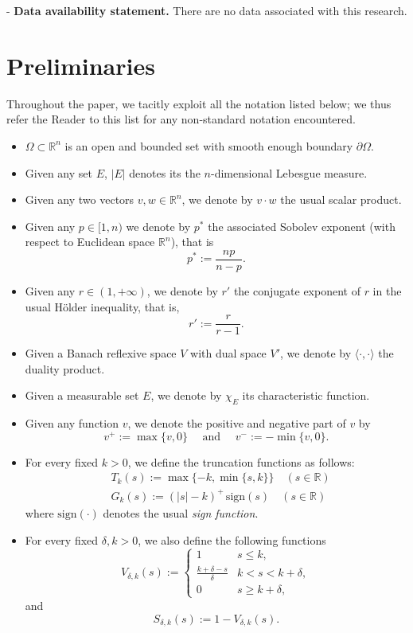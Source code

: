 \documentclass[11pt,a4paper]{amsart}
\theoremstyle{definition}
\theoremstyle{plain}
\numberwithin{equation}{section}
\begin{document}
\noindent-\,\,\textbf{Data availability statement.} There are no data associated with this research.

\section{Preliminaries}\label{sec.Prel}
 Throughout the paper, we tacitly
exploit all the notation listed below; we thus refer the Reader to this list
for any non-standard notation encountered.
\begin{itemize}
\item $\Omega \subset \mathbb{R}^{n}$ is an open and bounded set with smooth enough boundary $\partial \Omega$.
\item Given any set $E$, $|E|$ denotes its the $n$-dimensional Lebesgue measure.
\item Given any two vectors $v,w \in \mathbb{R}^{n}$, we denote by
$v\cdot w$ the usual scalar product.
\item Given any $p \in [1,n)$ we denote by $p^{*}$ the associated Sobolev exponent (with respect to Euclidean space $\mathbb{R}^n$), that is
$$p^{*}  := \frac{np}{n-p}.$$
\item Given any $r \in (1,+\infty)$, we denote by $r'$ the conjugate exponent of $r$ in the usual H\"older inequality, that is, 
$$r'  := \frac{r}{r-1}.$$
\item Given a Banach reflexive space $V$ with dual space $V'$, we denote by 
$\langle \cdot,\cdot\rangle$
the duality product. 
\item Given a measurable set $E$, we denote by $\chi_{E}$ its characteristic function.
\item Given any function $v$, we denote the positive and negative part of $v$ by 
\begin{equation}\label{eq:def_positive_negative_part}
v^{+}:= \max\{v,0\} \quad \textrm{ and } \quad v^{-}:= -\min\{v,0\}.
\end{equation}
\item For every fixed $k>0$, we define the truncation functions as follows:
\begin{align}
& T_{k}(s):= \max \{ -k, \min\{s,k\}\} \quad (s \in \mathbb{R}) \label{eq:def_Tk} \\
& G_{k}(s):= (|s|-k)^{+} \, \mathrm{sign}(s) \quad (s\in \mathbb{R}) \label{eq:def_Gk}
\end{align}
\noindent where $\mathrm{sign}(\cdot)$ denotes the usual {\it sign function}.
\item  For every fixed $\delta,k>0$, we also define the following functions
\begin{equation}\label{eq:def_V_delta_k}
V_{\delta,k}(s):= \left\{\begin{array}{lr}
1 & s \leq k,\\
\tfrac{k+\delta-s}{\delta} & k<s<k+\delta,\\
0 & s \geq k+\delta,
\end{array}\right.
\end{equation}
\noindent and 
\begin{equation}\label{eq:def_S_delta_k}
S_{\delta,k}(s):= 1 - V_{\delta,k}(s).
\end{equation}
\end{itemize}
\medskip
\end{document}
